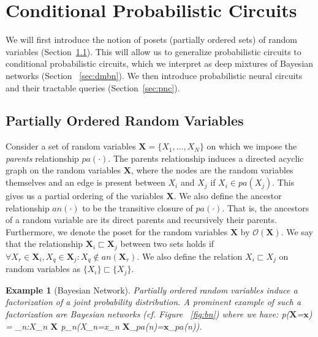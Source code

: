 \documentclass[letterpaper]{article} %
\newcommand{\cf}{cf.\xspace}
\newtheorem{example}[theorem]{Example}
\newenvironment{talign}
{\let\displaystyle\textstyle\align}
{\endalign}
\newcommand{\Xvars}{\ensuremath{\mathbf{X}}}
\newcommand{\xvars}{\ensuremath{\mathbf{x}}}
\newcommand{\Xvar}{\ensuremath{X}}
\newcommand{\parents}{\ensuremath{{pa}}}
\newcommand{\ancestors}{\ensuremath{{an}}}
\begin{document}
\section{Conditional Probabilistic Circuits}
\label{sec:cpc}

We will first introduce the notion of posets (partially ordered sets) of random variables (Section~\ref{sec:poset}).
This will allow us to generalize probabilistic circuits to conditional probabilistic circuits, which we interpret as deep mixtures of Bayesian networks (Section ~\ref{sec:dmbn}).
We then introduce probabilistic neural circuits and their tractable queries (Section~\ref{sec:pnc}).



\subsection{Partially Ordered Random Variables}
\label{sec:poset}

Consider a set of random variables $\Xvars {=}\{\Xvar_1,\dots, \Xvar_N \}$ on which we impose the \textit{parents} relationship $\parents(\cdot)$.
The parents relationship induces a directed acyclic graph on the random variables $\Xvars$, where the nodes are the random variables themselves and an edge is present between $\Xvar_i$ and $\Xvar_j$ if $\Xvar_i {\in} \parents(\Xvar_j)$.
This gives us a partial ordering of the variables $\Xvars$.
We also define the ancestor relationship $\ancestors(\cdot)$ to be the transitive closure of $\parents(\cdot)$. That is, the ancestors of a random variable are its direct parents and recursively their parents.
Furthermore, we denote the poset for the random variables $\Xvars$ by $\mathcal{O}(\Xvars)$. We say that the relationship $\Xvars_i {\sqsubset} \Xvars_j$ between two sets holds if
$
    \forall \Xvar_r {\in} \Xvars_i, \Xvar_q {\in} \Xvars_j : \Xvar_q {\notin}  \ancestors(\Xvars_r)
$.
We also define the relation $\Xvar_i\sqsubset \Xvar_j$ on random variables as $\{\Xvar_i \}{\sqsubset} \{\Xvar_j \}$.




\begin{example}[Bayesian Network]
    Partially ordered random variables induce a factorization of a joint probability distribution. A prominent example of such a factorization are Bayesian networks (\cf Figure ~\ref{fig:bn}) where we have:
    \begin{talign}
        \label{eq:bn}
        p(\Xvars{=}\xvars) = \prod_{n:\Xvar_n \in \Xvars} p_n(X_n{=}x_n \mid \Xvars_{\parents(n)}{=}\xvars_{\parents(n)}).
    \end{talign}
\end{example}
\end{document}
